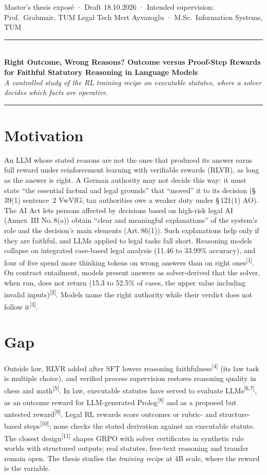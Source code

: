\documentclass[10pt,a4paper]{article}
\newcommand{\cit}[1]{\textsuperscript{\color{muted}[#1]}}
\begin{document}
{\footnotesize\color{muted} Master's thesis exposé · Draft 18.10.2026 · Intended supervision: Prof.\ Grabmair, TUM Legal Tech \hfill Mert Ayvazoglu · M.Sc.\ Information Systems, TUM}\\[-2pt]
{\color{accent}\rule{\linewidth}{0.8pt}}\\[0pt]
{\fontsize{13}{15}\selectfont\bfseries Right Outcome, Wrong Reasons? Outcome versus Proof-Step Rewards\\[-1pt] for Faithful Statutory Reasoning in Language Models}\\[1.5pt]
{\small\itshape A controlled study of the RL training recipe on executable statutes, where a solver decides which facts are operative.}\\[-3pt]
{\color{accent}\rule{\linewidth}{0.4pt}}

\section{Motivation}
An LLM whose stated reasons are not the ones that produced its answer earns full reward under reinforcement learning with verifiable rewards (RLVR), as long as the answer is right. A German authority may not decide this way: it must state ``the essential factual and legal grounds'' that ``moved'' it to its decision (§\,39(1) sentence~2 VwVfG; tax authorities owe a weaker duty under §\,121(1) AO). The AI Act lets persons affected by decisions based on high-risk legal AI (Annex~III No.\,8(a)) obtain ``clear and meaningful explanations'' of the system's role and the decision's main elements (Art.\,86(1)). Such explanations help only if they are faithful, and LLMs applied to legal tasks fall short. Reasoning models collapse on integrated case-based legal analysis (11.46 to 33.99\% accuracy), and four of five spend more thinking tokens on wrong answers than on right ones\cit{1}. On contract entailment, models present answers as solver-derived that the solver, when run, does not return (15.3 to 52.5\% of cases, the upper value including invalid inputs)\cit{2}. Models name the right authority while their verdict does not follow it\cit{3}.

\section{Gap}
Outside law, RLVR added after SFT lowers reasoning faithfulness\cit{4} (its law task is multiple choice), and verified process supervision restores reasoning quality in chess and math\cit{5}. In law, executable statutes have served to evaluate LLMs\cit{6,7}, as an outcome reward for LLM-generated Prolog\cit{8} and as a proposed but untested reward\cit{9}. Legal RL rewards score outcomes or rubric- and structure-based steps\cit{10}; none checks the stated derivation against an executable statute. The closest design\cit{11} shapes GRPO with solver certificates in synthetic rule worlds with structured outputs; real statutes, free-text reasoning and transfer remain open. The thesis studies the \emph{training recipe} at 4B scale, where the reward is the variable.
\end{document}
